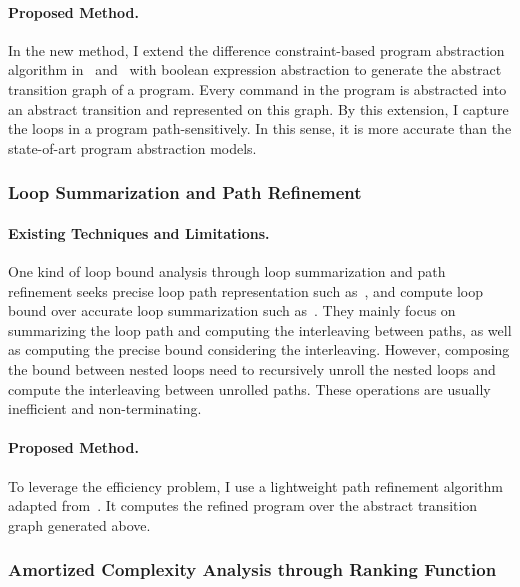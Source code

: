 \paragraph{Proposed Method.}
In the new method, I extend the difference constraint-based program abstraction algorithm in~\cite{SinnZV17} and~\cite{SinnZV14} with boolean expression abstraction to generate the abstract transition graph
of a program.
Every command in the program is abstracted into an abstract transition and represented on this graph.
By this extension, I capture the loops in a program
path-sensitively. 
In this sense, it is more accurate than the state-of-art program abstraction models.


\subsubsection{Loop Summarization and Path Refinement}
\paragraph{Existing Techniques and Limitations.}
One kind of loop bound analysis through loop summarization and path refinement seeks precise loop path representation such as~\cite{ManoliosV06, BalakrishnanSIG09, SharmaDDA11, Flores-MontoyaH14, HumenbergerJK18, CyphertBKR19}, and compute loop bound over accurate loop summarization such as~\cite{GulwaniJK09, ZulegerGSV11}.
They mainly focus on summarizing the loop path and computing the interleaving between paths, as well as computing the precise bound considering the interleaving. However, composing the bound between nested loops
need to recursively unroll the nested loops and compute the interleaving between unrolled paths.
These operations are usually inefficient and non-terminating.
\paragraph{Proposed Method.}
To leverage the efficiency problem, I use a lightweight path refinement algorithm adapted from~\cite{GulwaniJK09}.
It computes the refined program over the abstract transition graph generated above.


\subsubsection{Amortized Complexity Analysis through Ranking Function}
